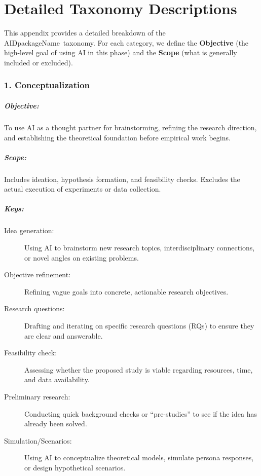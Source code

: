 
\chapter{Detailed  Taxonomy Descriptions}
\label{app:taxonomy}

This appendix provides a detailed breakdown of the \\AIDpackageName\ taxonomy.
For each category, we define the \textbf{Objective} (the high-level goal of using \gls{AI} in this phase) and the \textbf{Scope} (what is generally included or excluded).

\begingroup
\setparaheadstyle{\normalfont\normalsize\bfseries\color{blue!80!black}}

\subsection*{1. Conceptualization}
\paragraph{Objective:} To use \gls{AI} as a thought partner for brainstorming, refining the research direction, and establishing the theoretical foundation before empirical work begins.
\paragraph{Scope:} Includes ideation, hypothesis formation, and feasibility checks. Excludes the actual execution of experiments or data collection.
\paragraph{Keys:}
\begin{description}
    \item[Idea generation:] Using \gls{AI} to brainstorm new research topics, interdisciplinary connections, or novel angles on existing problems.
    \item[Objective refinement:] Refining vague goals into concrete, actionable research objectives.
    \item[Research questions:] Drafting and iterating on specific research questions (RQs) to ensure they are clear and answerable.
    \item[Feasibility check:] Assessing whether the proposed study is viable regarding resources, time, and data availability.
    \item[Preliminary research:] Conducting quick background checks or “pre-studies” to see if the idea has already been solved.
    \item[Simulation/Scenarios:] Using \gls{AI} to conceptualize theoretical models, simulate persona responses, or design hypothetical scenarios.
\end{description}

